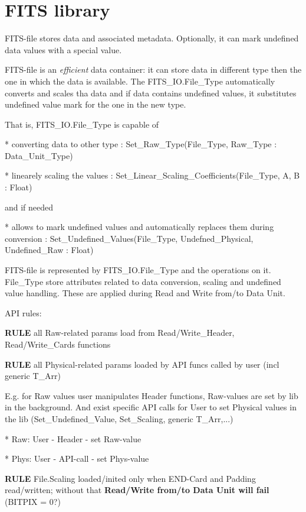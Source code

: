 \documentclass[a4paper,10pt]{article}
\begin{document}
\tableofcontents

\section{FITS library}

FITS-file stores data and associated metadata. Optionally, it can mark undefined
data values with a special value.

FITS-file is an \textit{efficient} data container:
it can store data in different type then the one in which the data is available.
The FITS\_IO.File\_Type automatically converts and scales tha data and if data
contains undefined values, it substitutes undefined value mark for the one in the new type.


That is, FITS\_IO.File\_Type is capable of

* converting data to other type : Set\_Raw\_Type(File\_Type, Raw\_Type : Data\_Unit\_Type)

* linearely scaling the values : Set\_Linear\_Scaling\_Coefficients(File\_Type, A, B : Float)

and if needed

* allows to mark undefined values and automatically replaces them during conversion
: Set\_Undefined\_Values(File\_Type, Undefned\_Physical, Undefined\_Raw : Float)

FITS-file is represented by FITS\_IO.File\_Type and the operations on it. 
File\_Type store attributes related to data conversion, scaling and undefined value handling.
These are applied during Read and Write from/to Data Unit.


API rules:

\textbf{RULE} all Raw-related params load from Read/Write\_Header, Read/Write\_Cards functions

\textbf{RULE} all Physical-related params loaded by API funcs called by user (incl generic T\_Arr)

E.g. for Raw values user manipulates Header functions, Raw-values are set by lib
in the background. And exist specific API calls for User to set Physical values in the lib
(Set\_Undefined\_Value, Set\_Scaling, generic T\_Arr,...)


* Raw:  User - Header - set Raw-value

* Phys: User - API-call - set Phys-value

\textbf{RULE} File.Scaling loaded/inited only when END-Card and Padding read/written;
without that \textbf{Read/Write from/to Data Unit will fail} (BITPIX = 0?)
\end{document}
